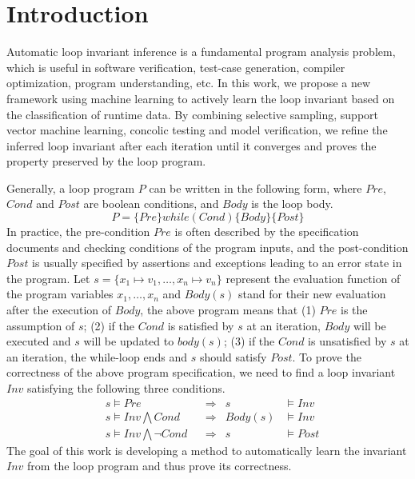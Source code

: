 
\section{Introduction} %
\label{sec:introduction}

Automatic loop invariant inference is a fundamental program analysis problem, 
which is useful in software verification, test-case generation, 
compiler optimization, program understanding, etc. 
In this work, we propose a new framework using machine learning 
to actively learn the loop invariant based on the classification of runtime data. 
By combining selective sampling, support vector machine learning, 
concolic testing and model verification, 
we refine the inferred loop invariant after each iteration 
until it converges and proves the property preserved by the loop program. 

Generally, a loop program $P$ can be written in the following form, 
where $\mathit{Pre}$, $\mathit{Cond}$ and $\mathit{Post}$ are boolean conditions, 
and $\mathit{Body}$ is the loop body. 
\[
    P = \{ \mathit{Pre} \} \mathit{while}(\mathit{Cond}) \{ \mathit{Body} \} \{ \mathit{Post} \}
\]
In practice, the pre-condition $\mathit{Pre}$ is often described by 
the specification documents and checking conditions of the program inputs, 
and the post-condition $\mathit{Post}$ is usually specified 
by assertions and exceptions leading to an error state in the program. 
Let $s = \{ x_1 \mapsto v_1, \ldots, x_n \mapsto v_n \}$ represent 
the evaluation function of the program variables $x_1, \ldots, x_n$
and $\mathit{Body}(s)$ stand for their new evaluation after the execution of $\mathit{Body}$, 
the above program means that (1) $\mathit{Pre}$ is the assumption of $s$; 
(2) if the $\mathit{Cond}$ is satisfied by $s$ at an iteration, 
$\mathit{Body}$ will be executed and $s$ will be updated to $\mathit{body}(s)$; 
(3) if the $\mathit{Cond}$ is unsatisfied by $s$ at an iteration, 
the while-loop ends and $s$ should satisfy $\mathit{Post}$. 
To prove the correctness of the above program specification, 
we need to find a loop invariant $\mathit{Inv}$ satisfying the following three conditions. 
\begin{align}
    &s \models \mathit{Pre} 
        &&\Rightarrow & s &\models \mathit{Inv} \label{inv:pre} \\
    &s \models \mathit{Inv} \bigwedge \mathit{Cond} 
        &&\Rightarrow & \mathit{Body}(s) &\models \mathit{Inv} \label{inv:loop} \\
    &s \models \mathit{Inv} \bigwedge \neg\mathit{Cond} 
        &&\Rightarrow & s &\models \mathit{Post} \label{inv:post}
\end{align}
The goal of this work is developing a method to automatically learn 
the invariant $\mathit{Inv}$ from the loop program and thus prove its correctness. 

